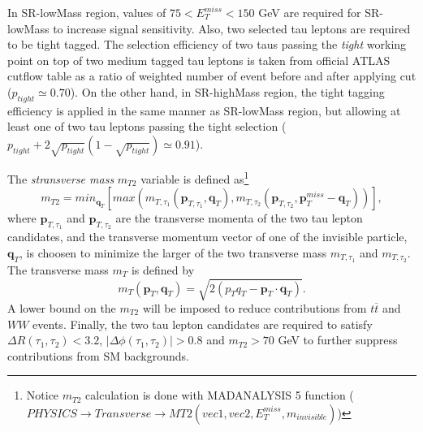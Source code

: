 \documentclass{ws-mpla}
\begin{document}
In SR-lowMass region, values of $75 < E^{miss}_T < 150$ GeV are required for SR-lowMass to increase signal sensitivity.
Also, two selected tau leptons are required to be tight tagged.
The selection efficiency of two taus passing the \textit{tight} working point on top of two medium tagged tau leptons is taken from official ATLAS cutflow table as a ratio of weighted number of event before and after applying cut ($p_{tight}\simeq 0.70$).
On the other hand, in SR-highMass region, the tight tagging efficiency is applied in the same manner as SR-lowMass region, but allowing at least one of two tau leptons passing the tight selection ($p_{tight} + 2\sqrt{p_{tight}}(1-\sqrt{p_{tight}})\simeq 0.91$).

The \textit{stransverse mass} $m_{T2}$ variable is defined as\footnote{
Notice $m_{T2}$ calculation is done with MADANALYSIS 5 function ($PHYSICS\rightarrow Transverse\rightarrow MT2(vec1,vec2,E^{miss}_T,m_{invisible})$)
}
\begin{equation}
m_{T2} =min_{\mathbf{q}_T}
\left[
max(m_{T,\tau_1}(\mathbf{p}_{T,\tau_1},\mathbf{q}_T),m_{T,\tau_2}(\mathbf{p}_{T,\tau_2},\mathbf{p}^{miss}_T -\mathbf{q}_T))
\right],
\end{equation}   
where $\mathbf{p}_{T,\tau_1}$ and $\mathbf{p}_{T,\tau_2}$ are the transverse momenta of the two tau lepton candidates, and the transverse momentum vector of one of the invisible particle, $\mathbf{q}_T$, is choosen to minimize the larger of the two transverse mass $m_{T,\tau_1}$ and $m_{T,\tau_2}$. The transverse mass $m_T$ is defined by
\begin{equation}
m_{T}(\mathbf{p}_T,\mathbf{q}_T) = \sqrt{2(p_T q_T -\mathbf{p}_T\cdot\mathbf{q}_T)}.
\end{equation} 
A lower bound on the $m_{T2}$ will be imposed to reduce contributions from $t\overline{t}$ and $WW$ events.
Finally, the two tau lepton candidates are required to satisfy $\Delta R(\tau_1,\tau_2) < 3.2$, $|\Delta\phi (\tau_1,\tau_2)| > 0.8$ and $m_{T2} > 70$ GeV to further suppress contributions from SM backgrounds.


\end{document}
